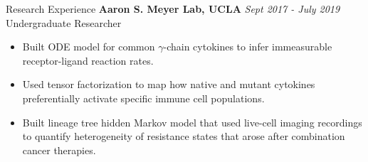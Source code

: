 \documentclass{resume} %
\begin{document}
\begin{rSection}{Research Experience}
{\bf Aaron S. Meyer Lab, UCLA} \hfill {\em Sept 2017 - July 2019} \\
Undergraduate Researcher
\begin{itemize}
  \item Built ODE model for common $\gamma$-chain cytokines to infer immeasurable receptor-ligand reaction rates.
  \item Used tensor factorization to map how native and mutant cytokines preferentially activate specific immune cell populations.
  \item Built lineage tree hidden Markov model that used live-cell imaging recordings to quantify heterogeneity of resistance states that arose after combination cancer therapies.
\end{itemize}




\end{rSection}
\end{document}
